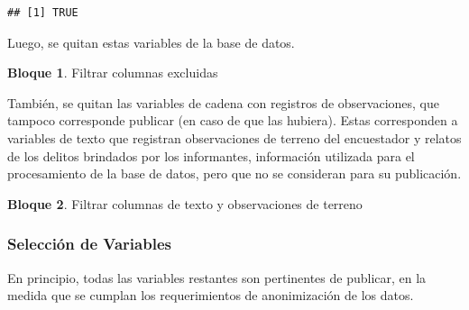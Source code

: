 \documentclass[]{book}
\newenvironment{Shaded}{\begin{snugshade}}{\end{snugshade}}
\newcommand{\KeywordTok}[1]{\textcolor[rgb]{0.13,0.29,0.53}{\textbf{#1}}}
\newcommand{\NormalTok}[1]{#1}
\newcommand{\OperatorTok}[1]{\textcolor[rgb]{0.81,0.36,0.00}{\textbf{#1}}}
\newcommand{\StringTok}[1]{\textcolor[rgb]{0.31,0.60,0.02}{#1}}
\theoremstyle{definition}
\theoremstyle{definition}
\newtheorem{example}{Bloque}[chapter]
\theoremstyle{definition}
\theoremstyle{definition}
\theoremstyle{remark}
\begin{document}
\begin{verbatim}
## [1] TRUE
\end{verbatim}

Luego, se quitan estas variables de la base de datos.

\begin{example}
\protect\hypertarget{exm:bloque27nbm}{}{\label{exm:bloque27nbm} }Filtrar columnas excluidas
\end{example}

\begin{Shaded}
\end{Shaded}

También, se quitan las variables de cadena con registros de observaciones, que tampoco corresponde publicar (en caso de que las hubiera). Estas corresponden a variables de texto que registran observaciones de terreno del encuestador y relatos de los delitos brindados por los informantes, información utilizada para el procesamiento de la base de datos, pero que no se consideran para su publicación.

\begin{example}
\protect\hypertarget{exm:bloque28nbm}{}{\label{exm:bloque28nbm} }Filtrar columnas de texto y observaciones de terreno
\end{example}

\begin{Shaded}
\end{Shaded}

\hypertarget{selecciuxf3n-de-variables}{%
\subsubsection{Selección de Variables}\label{selecciuxf3n-de-variables}}

En principio, todas las variables restantes son pertinentes de publicar, en la medida que se cumplan los requerimientos de anonimización de los datos.
\end{document}
